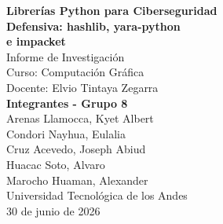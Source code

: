 \documentclass[12pt,a4paper]{article}
\title{}
\author{}
\date{}
\begin{document}
\begin{titlepage}
\thispagestyle{empty}
\begin{center}
\vspace*{4cm}

{\LARGE \textbf{Librerías Python para Ciberseguridad}}\\[8pt]
{\LARGE \textbf{Defensiva: hashlib, yara-python}}\\[8pt]
{\LARGE \textbf{e impacket}}\\[24pt]

{\large Informe de Investigación}\\[12pt]
{\large Curso: Computación Gráfica}\\[12pt]
{\large Docente: Elvio Tintaya Zegarra}\\[36pt]

{\large \textbf{Integrantes - Grupo 8}}\\[12pt]
{\large Arenas Llamocca, Kyet Albert}\\[4pt]
{\large Condori Nayhua, Eulalia}\\[4pt]
{\large Cruz Acevedo, Joseph Abiud}\\[4pt]
{\large Huacac Soto, Alvaro}\\[4pt]
{\large Marocho Huaman, Alexander}\\[24pt]

{\large Universidad Tecnológica de los Andes}\\[24pt]

{\large 30 de junio de 2026}

\end{center}
\end{titlepage}
\end{document}
